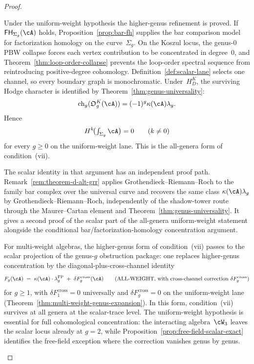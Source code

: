 \begin{proof}
\begin{remark}
Under the uniform-weight hypothesis the higher-genus refinement is proved.
If $\mathsf{FH}_{\Sigma_g}(\cA)$ holds, Proposition~\ref{prop:bar-fh}
supplies the bar comparison model for factorization homology on the
curve~$\Sigma_g$. On the Koszul locus, the genus-$0$ PBW collapse
forces each vertex contribution to be concentrated in degree~$0$, and
Theorem~\ref{thm:loop-order-collapse} prevents the loop-order
spectral sequence from reintroducing positive-degree cohomology.
Definition~\ref{def:scalar-lane} selects one channel, so every
boundary graph is monochromatic.  Under~$H_D^K$, the surviving Hodge
character is identified by Theorem~\ref{thm:genus-universality}:
\[
\operatorname{ch}_g(\mathfrak O_g^K(\cA))
=(-1)^g\kappa(\cA)\lambda_g.
\]
Hence
\[
H^k\!\bigl(\textstyle\int_{\Sigma_g}\cA\bigr)=0
\qquad (k \neq 0)
\]
for every $g \geq 0$ on the uniform-weight lane. This is the
all-genera form of condition~\textup{(vii)}.

The scalar identity in that argument has an independent proof path.
Remark~\ref{rem:theorem-d-alt-grr} applies
Grothendieck--Riemann--Roch to the family bar complex over the
universal curve and recovers the same class
$\kappa(\cA)\lambda_g$ by Grothendieck--Riemann--Roch, independently
of the shadow-tower route through the Maurer--Cartan element and
Theorem~\ref{thm:genus-universality}.  It gives a second proof of the
scalar part of the all-genera uniform-weight statement alongside the
conditional bar/factorization-homology concentration argument.

For multi-weight algebras, the higher-genus form of
condition~\textup{(vii)} passes to the scalar projection of the
genus-$g$ obstruction
package: one replaces higher-genus concentration by the
diagonal-plus-cross-channel identity
\[
F_g(\cA)
\;=\;
\kappa(\cA)\cdot\lambda_g^{\mathrm{FP}}
\;+\;
\delta F_g^{\mathrm{cross}}(\cA)
\qquad
\textup{(ALL-WEIGHT, with cross-channel correction
$\delta F_g^{\mathrm{cross}}$)}
\]
for $g \geq 1$, with
$\delta F_1^{\mathrm{cross}}=0$ universally and
$\delta F_g^{\mathrm{cross}}=0$ on the uniform-weight lane
\textup{(}Theorem~\ref{thm:multi-weight-genus-expansion}\textup{)}.
In this form, condition~\textup{(vii)} survives at all genera at the
scalar-trace level.  The uniform-weight hypothesis is essential for
full cohomological concentration: the interacting algebra~$\cW_3$
leaves the scalar locus
already at $g=2$, while
Proposition~\ref{prop:free-field-scalar-exact} identifies the
free-field exception where the correction vanishes genus by genus.


\end{remark}
\end{proof}
